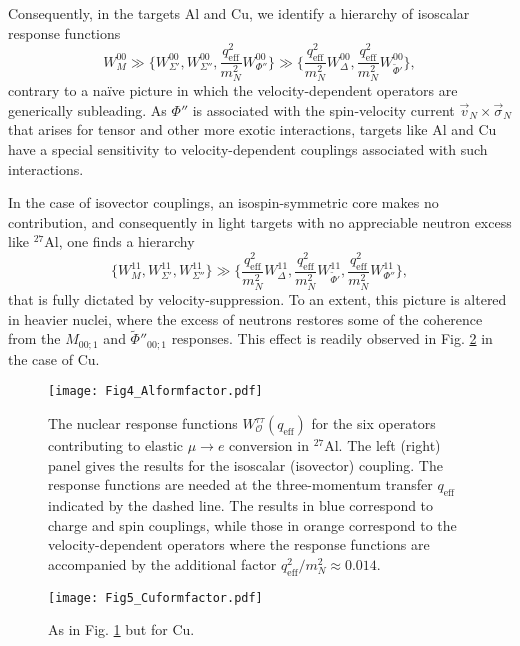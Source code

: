 \documentclass{book}[letterpaper,12pt]
\begin{document}
Consequently, in the targets Al and Cu, we identify a hierarchy of isoscalar response functions
\begin{equation}
W_M^{00}\gg \bigg\{W^{00}_{\Sigma'},W_{\Sigma''}^{00},\frac{q_\mathrm{eff}^2}{m_N^2}W^{00}_{\Phi''}\bigg\}\gg\bigg\{\frac{q_\mathrm{eff}^2}{m_N^2}W^{00}_{\Delta},\frac{q^2_\mathrm{eff}}{m_N^2}W_{\tilde{\Phi}'}^{00}\bigg\},
\end{equation}
contrary to a na\"ive picture in which the velocity-dependent operators are generically subleading. As $\Phi''$ is associated with the spin-velocity current $\vec{v}_N\times\vec{\sigma}_N$ that arises for tensor and other more exotic interactions, targets like Al and Cu have a special sensitivity to velocity-dependent couplings associated with such interactions. 

In the case of isovector couplings, an isospin-symmetric core makes no contribution, and consequently in light targets with no appreciable neutron excess like $^{27}$Al, one finds a hierarchy
\begin{equation}
\bigg\{W_M^{11},W^{11}_{\Sigma'},W_{\Sigma''}^{11}\bigg\}\gg\bigg\{\frac{q_\mathrm{eff}^2}{m_N^2}W^{11}_{\Delta},\frac{q^2_\mathrm{eff}}{m_N^2}W_{\tilde{\Phi}'}^{11},\frac{q^2_\mathrm{eff}}{m_N^2}W^{11}_{\Phi''}\bigg\},
\end{equation}
that is fully dictated by velocity-suppression. To an extent, this picture is altered in heavier nuclei, where the excess of neutrons restores some of the coherence from the $M_{00;1}$ and $\tilde{\Phi}''_{00;1}$ responses. This effect is readily observed in Fig. \ref{fig:Cu_responses} in the case of Cu.
\begin{figure}
\centering
\texttt{[image: Fig4\_Alformfactor.pdf]}
\caption{The nuclear response functions $W^{\tau\tau}_\mathcal{O}(q_\mathrm{eff})$ for the six operators contributing to elastic $\mu\rightarrow e$ conversion in $^{27}$Al. The left (right) panel gives the results for the isoscalar (isovector) coupling. The response functions are needed at the three-momentum transfer $q_\mathrm{eff}$ indicated by the dashed line. The results in blue correspond to charge and spin couplings, while those in orange correspond to the velocity-dependent operators where the response functions are accompanied by the additional factor $q^2_\mathrm{eff}/m_N^2\approx 0.014$.}
\label{fig:Al_responses}
\end{figure}
\begin{figure}
\centering
\texttt{[image: Fig5\_Cuformfactor.pdf]}
\caption{As in Fig. \ref{fig:Al_responses} but for Cu.}
\label{fig:Cu_responses}
\end{figure}
\end{document}
